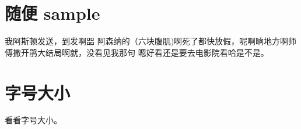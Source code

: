 \documentclass[12pt]{book} %
\begin{document}

\section{随便 sample}%
\begin{withgezhu}
我阿斯顿发送，到发啊㗊\,\,阿森纳的（六块腹肌)啊死了都快放假，呢啊晌地方啊师傅撒开鹃大结局啊就，没看见我那句\,\,嗯好看还是要去电影院看哈是不是。
\end{withgezhu}

\section{字号大小}
看看字号大小。
\end{document}
